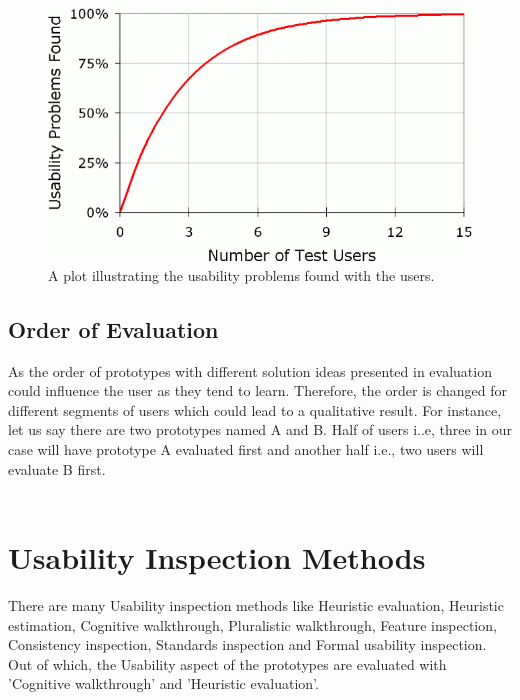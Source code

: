 \begin{figure}[hbt!]
	\centering
	\includegraphics[width=\linewidth]{figures/fiveplot}
	\caption{A plot illustrating the usability problems found with the users.\cite{5users}}
	\label{fig:5plot}
\end{figure}

\subsection{Order of Evaluation}

As the order of prototypes with different solution ideas presented in evaluation could influence the user as they tend to learn. Therefore, the order is changed for different segments of users which could lead to a qualitative result. For instance, let us say there are two prototypes named A and B. Half of users i..e, three in our case will have prototype A evaluated first and another half i.e., two users will evaluate B first. \\ \\

\section{Usability Inspection Methods}

There are many Usability inspection methods \cite{nielsen1994usability} like Heuristic evaluation, Heuristic estimation, Cognitive walkthrough, Pluralistic walkthrough, Feature inspection, Consistency inspection, Standards inspection and Formal usability inspection.  Out of which, the Usability aspect of the prototypes are evaluated with  'Cognitive walkthrough' and 'Heuristic evaluation'. \\ \\

